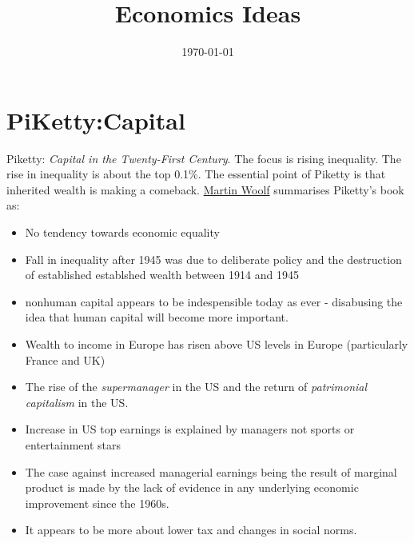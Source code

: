 \documentclass[12pt, a4paper, oneside]{article}\usepackage[]{graphicx}\usepackage[]{color}
\begin{document}
\title{Economics Ideas}
\date{\today}
\maketitle

\section*{PiKetty:Capital}
Piketty:  \emph{Capital in the Twenty-First Century}.  The focus is rising inequality.  The rise in inequality is about the top 0.1\%.  The essential point of Piketty is that inherited wealth is making a comeback.  \href{http://www.ft.com/cms/s/2/0c6e9302-c3e2-11e3-a8e0-00144feabdc0.html#axzz2z7YbuMqh}{Martin Woolf} summarises Piketty's book as:
\begin{itemize}
\item No tendency towards economic equality
\item Fall in inequality after 1945 was due to deliberate policy and the destruction of established establshed wealth between 1914 and 1945
\item nonhuman capital appears to be indespensible today as ever - disabusing the idea that human capital will become more important.
\item Wealth to income in Europe has risen above US levels in Europe (particularly France and UK)
\item The rise of the \emph{supermanager} in the US and the return of \emph{patrimonial capitalism} in the US.
\item Increase in US top earnings is explained by managers not sports or entertainment stars
\item The case against increased managerial earnings being the result of marginal product is made by the lack of evidence in any underlying economic improvement since the 1960s.  
\item It appears to be more about lower tax and changes in social norms.
\end{itemize}
\end{document}

